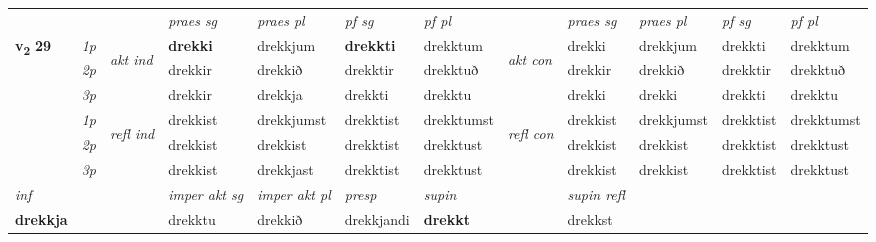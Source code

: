 \begin{longtable}[l]{X>{\footnotesize\itshape}llXXXXlXXXX}
 & &   & \textit{praes sg}  & \textit{praes pl}    & \textit{ pf sg} & \textit{pf pl} & & \textit{praes sg}  & \textit{praes pl}    & \textit{pf sg} & \textit{pf pl }  \\ \cmidrule{4-7} \cmidrule{9-12}
 \multirow{2}{*}{{{\textbf{v{\textsubscript{2}}} \Large{\textbf{29}}}}}  & 1p & \multirow{3}{*}{\begin{turn}{90}\textit{akt ind}\end{turn}} & \textbf{drekki} & drekkjum & \textbf{drekkti} & drekktum & \multirow{3}{*}{\begin{turn}{90}\textit{akt con}\end{turn}} &drekki & drekkjum & drekkti & drekktum\\*
 & 2p &  &  drekkir  & drekkið & drekktir & drekktuð & & drekkir & drekkið & drekktir & drekktuð \\*
 & 3p &  & drekkir & drekkja & drekkti & drekktu & & drekki & drekki& drekkti & drekktu \\*
\cmidrule{4-7} \cmidrule{9-12}
 & 1p & \multirow{3}{*}{\begin{turn}{90}\textit{refl ind}\end{turn}}  & drekkist & drekkjumst & drekktist & drekktumst & \multirow{3}{*}{\begin{turn}{90}\textit{refl con}\end{turn}}  &drekkist & drekkjumst & drekktist & drekktumst \\*
 & 2p &  & drekkist & drekkist & drekktist & drekktust & &drekkist & drekkist & drekktist & drekktust \\*
 & 3p  & & drekkist & drekkjast & drekktist & drekktust & & drekkist & drekkist& drekktist & drekktust \\*
\cmidrule{4-7} \cmidrule{9-12}

   {\textit{inf}} & &  & \textit{imper akt sg} & \textit{imper akt pl}   & \textit{presp} & \textit{supin} && \textit{supin refl}  \\*
  {\textbf{drekkja}} & && drekktu  & drekkið   & drekkjandi &  \textbf{drekkt} && drekkst  \\*

\midrule


\end{longtable}
